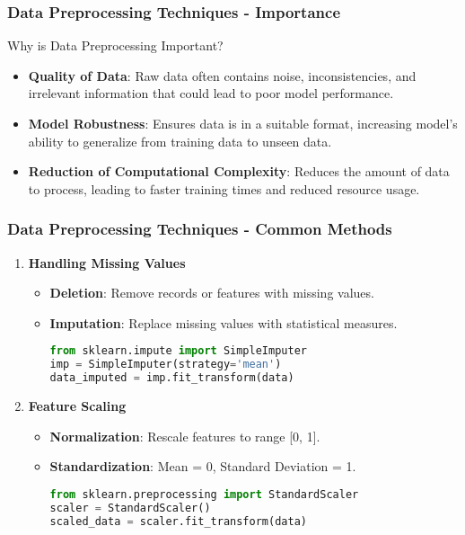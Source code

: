 \documentclass[aspectratio=169]{beamer}
\begin{document}
\begin{frame}
    \frametitle{Data Preprocessing Techniques - Importance}
    \begin{block}{Why is Data Preprocessing Important?}
        \begin{itemize}
            \item \textbf{Quality of Data}: Raw data often contains noise, inconsistencies, and irrelevant information that could lead to poor model performance.
            \item \textbf{Model Robustness}: Ensures data is in a suitable format, increasing model's ability to generalize from training data to unseen data.
            \item \textbf{Reduction of Computational Complexity}: Reduces the amount of data to process, leading to faster training times and reduced resource usage.
        \end{itemize}
    \end{block}
\end{frame}

\begin{frame}[fragile]
    \frametitle{Data Preprocessing Techniques - Common Methods}
    \begin{enumerate}
        \item \textbf{Handling Missing Values}
            \begin{itemize}
                \item \textbf{Deletion}: Remove records or features with missing values.
                \item \textbf{Imputation}: Replace missing values with statistical measures.
                \begin{lstlisting}[language=Python]
from sklearn.impute import SimpleImputer
imp = SimpleImputer(strategy='mean')
data_imputed = imp.fit_transform(data)
                \end{lstlisting}
            \end{itemize}
        \item \textbf{Feature Scaling}
            \begin{itemize}
                \item \textbf{Normalization}: Rescale features to range [0, 1].
                \item \textbf{Standardization}: Mean = 0, Standard Deviation = 1.
                \begin{lstlisting}[language=Python]
from sklearn.preprocessing import StandardScaler
scaler = StandardScaler()
scaled_data = scaler.fit_transform(data)
                \end{lstlisting}
            \end{itemize}
    \end{enumerate}
\end{frame}
\end{document}
